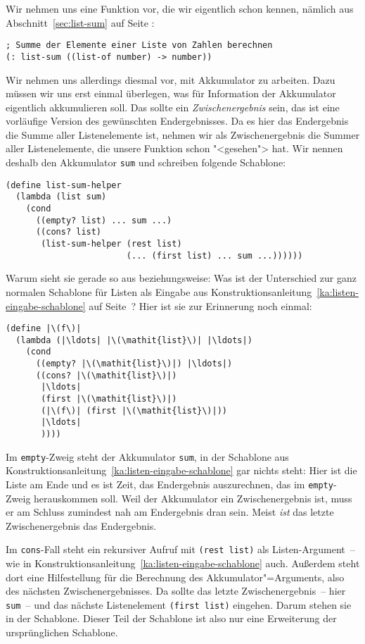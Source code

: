 Wir nehmen uns eine Funktion vor, die wir eigentlich schon kennen,
nämlich aus Abschnitt~\ref{sec:list-sum} auf Seite
\pageref{sec:list-sum}:\label{function:list-sum-acc}
%
\begin{lstlisting}
; Summe der Elemente einer Liste von Zahlen berechnen
(: list-sum ((list-of number) -> number))
\end{lstlisting}
%
Wir nehmen uns allerdings diesmal vor, mit Akkumulator zu arbeiten.
Dazu müssen wir uns erst einmal überlegen, was für Information der
Akkumulator eigentlich akkumulieren soll.  Das sollte ein
\textit{Zwischenergebnis} sein, das ist 
eine vorläufige Version des gewünschten Endergebnisses.  Da es 
hier das Endergebnis die Summe aller Listenelemente ist, nehmen wir
als Zwischenergebnis die Summer aller Listenelemente, die unsere
Funktion schon "<gesehen"> hat.  Wir nennen deshalb den
Akkumulator \lstinline{sum} und schreiben folgende Schablone:
%
\begin{lstlisting}
(define list-sum-helper
  (lambda (list sum)
    (cond
      ((empty? list) ... sum ...)
      ((cons? list)
       (list-sum-helper (rest list)
                        (... (first list) ... sum ...))))))
\end{lstlisting}
%
Warum sieht sie gerade so aus beziehungsweise: Was ist der Unterschied
zur ganz normalen Schablone für Listen als Eingabe aus
Konstruktionsanleitung~\ref{ka:listen-eingabe-schablone} auf
Seite~\pageref{ka:listen-eingabe-schablone}?   Hier ist sie zur
Erinnerung noch einmal:
%
\begin{lstlisting}
(define |\(f\)|
  (lambda (|\ldots| |\(\mathit{list}\)| |\ldots|)
    (cond
      ((empty? |\(\mathit{list}\)|) |\ldots|)
      ((cons? |\(\mathit{list}\)|)
       |\ldots|
       (first |\(\mathit{list}\)|)
       (|\(f\)| (first |\(\mathit{list}\)|))
       |\ldots|
       ))))
\end{lstlisting}
%
Im \lstinline{empty}-Zweig steht der Akkumulator \lstinline{sum}, in
der Schablone aus
Konstruktionsanleitung~\ref{ka:listen-eingabe-schablone} gar nichts
steht: Hier ist die Liste am Ende und es ist Zeit, das Endergebnis
auszurechnen, das im \lstinline{empty}-Zweig herauskommen soll.   Weil
der Akkumulator ein Zwischenergebnis ist, muss er am Schluss zumindest
nah am
Endergebnis dran sein.  Meist \emph{ist} das letzte
Zwischenergebnis das Endergebnis.

Im \lstinline{cons}-Fall steht ein rekursiver Aufruf mit
\lstinline{(rest list)} als Listen-Argument~-- wie in
Konstruktionsanleitung~\ref{ka:listen-eingabe-schablone} auch.
Außerdem steht dort eine Hilfestellung für die Berechnung des
Akkumulator"=Arguments, also des nächsten Zwischenergebnisses.  Da
sollte das letzte Zwischenergebnis~-- hier \lstinline{sum}~-- und das
nächste Listenelement \lstinline{(first list)} eingehen. Darum stehen
sie in der Schablone.  Dieser Teil der Schablone ist also nur eine
Erweiterung der ursprünglichen Schablone.

